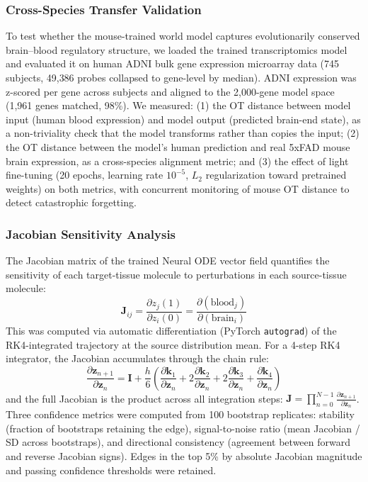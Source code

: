 \documentclass[12pt,a4paper]{article}
\begin{document}
\subsubsection{Cross-Species Transfer Validation}
To test whether the mouse-trained world model captures evolutionarily conserved brain--blood regulatory structure, we loaded the trained transcriptomics model and evaluated it on human ADNI bulk gene expression microarray data (745 subjects, 49{,}386 probes collapsed to gene-level by median). ADNI expression was z-scored per gene across subjects and aligned to the 2,000-gene model space (1{,}961 genes matched, 98\%). We measured: (1) the OT distance between model input (human blood expression) and model output (predicted brain-end state), as a non-triviality check that the model transforms rather than copies the input; (2) the OT distance between the model's human prediction and real 5xFAD mouse brain expression, as a cross-species alignment metric; and (3) the effect of light fine-tuning (20 epochs, learning rate $10^{-5}$, $L_2$ regularization toward pretrained weights) on both metrics, with concurrent monitoring of mouse OT distance to detect catastrophic forgetting.

\subsubsection{Jacobian Sensitivity Analysis}

The Jacobian matrix of the trained Neural ODE vector field quantifies the sensitivity of each target-tissue molecule to perturbations in each source-tissue molecule:
\begin{equation}
\mathbf{J}_{ij} = \frac{\partial z_j(1)}{\partial z_i(0)} = \frac{\partial (\text{blood}_j)}{\partial (\text{brain}_i)}
\end{equation}
This was computed via automatic differentiation (PyTorch \texttt{autograd}) of the RK4-integrated trajectory at the source distribution mean. For a 4-step RK4 integrator, the Jacobian accumulates through the chain rule:
\begin{equation}
\frac{\partial \mathbf{z}_{n+1}}{\partial \mathbf{z}_n} = \mathbf{I} + \frac{h}{6}\left(\frac{\partial \mathbf{k}_1}{\partial \mathbf{z}_n} + 2\frac{\partial \mathbf{k}_2}{\partial \mathbf{z}_n} + 2\frac{\partial \mathbf{k}_3}{\partial \mathbf{z}_n} + \frac{\partial \mathbf{k}_4}{\partial \mathbf{z}_n}\right)
\end{equation}
and the full Jacobian is the product across all integration steps: $\mathbf{J} = \prod_{n=0}^{N-1} \frac{\partial \mathbf{z}_{n+1}}{\partial \mathbf{z}_n}$. Three confidence metrics were computed from 100 bootstrap replicates: stability (fraction of bootstraps retaining the edge), signal-to-noise ratio (mean Jacobian / SD across bootstraps), and directional consistency (agreement between forward and reverse Jacobian signs). Edges in the top 5\% by absolute Jacobian magnitude and passing confidence thresholds were retained.
\end{document}
